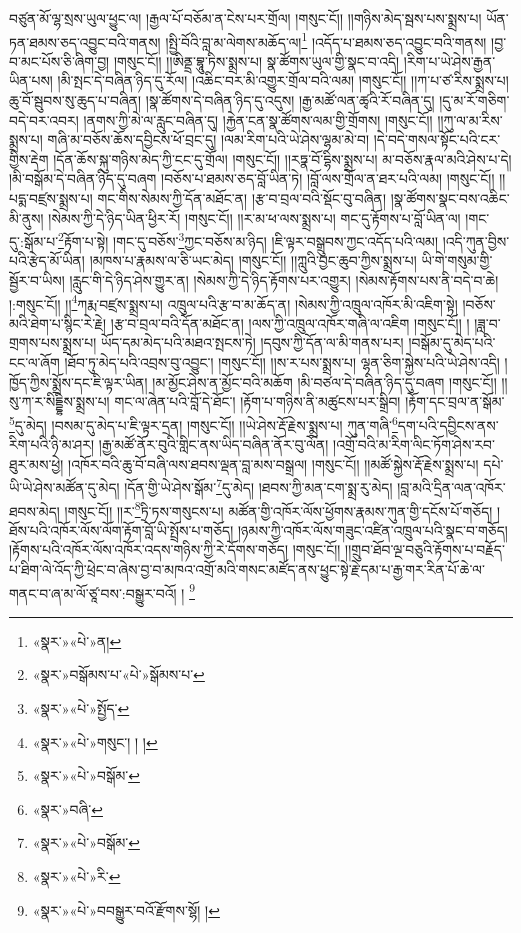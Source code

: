བཙུན་མོ་ལྷ་སྲས་ཡུལ་ཕྱུང་ལ། །རྒྱལ་པོ་བཅོམ་ན་ངེས་པར་གྲོལ། །གསུང་ངོ།། །།གཉིས་མེད་སྦས་པས་སྨྲས་པ། ཡོན་ཏན་ཐམས་ཅད་འབྱུང་བའི་གནས། །སྤྱི་བོའི་བླ་མ་ལེགས་མཆོད་ལ།\footnote{«སྣར་»«པེ་»ན།} །འདོད་པ་ཐམས་ཅད་འབྱུང་བའི་གནས། །བྱ་བ་མང་པོས་ཅི་ཞིག་བྱ། །གསུང་ངོ།། །།ཨིནྡྲ་བྷཱུ་ཏིས་སྨྲས་པ། སྣ་ཚོགས་ཡུལ་གྱི་སྣང་བ་འདི། །རིག་པ་ཡེ་ཤེས་རྒྱན་ཡིན་པས། །མི་སྤང་དེ་བཞིན་ཉིད་དུ་རོལ། །འཆིང་བར་མི་འགྱུར་གྲོལ་བའི་ལམ། །གསུང་ངོ།། །།ཀ་པ་ཙ་རིས་སྨྲས་པ། ཆུ་བོ་སྦུབས་སུ་ཆུད་པ་བཞིན། །སྣ་ཚོགས་དེ་བཞིན་ཉིད་དུ་འདུས། །རྒྱ་མཚོ་ལན་ཚྭའི་རོ་བཞིན་དུ། །དུ་མ་རོ་གཅིག་བདེ་བར་འབར། །ནགས་ཀྱི་མེ་ལ་རླུང་བཞིན་དུ། །རྐྱེན་ངན་སྣ་ཚོགས་ལམ་གྱི་གྲོགས། །གསུང་ངོ།། །།ཀུ་ལ་མ་རིས་སྨྲས་པ། གཞི་མ་བཅོས་ཆོས་དབྱིངས་ཕོ་བྲང་དུ། །ལམ་རིག་པའི་ཡེ་ཤེས་ལྷམ་མེ་བ། །དེ་བདེ་གསལ་སྟོང་པའི་ངར་གྱིས་རྡེག །དོན་ཆོས་སྐུ་གཉིས་མེད་ཀྱི་ངང་དུ་གྲོལ། །གསུང་ངོ།། །།རཏྣ་བོ་དྷིས་སྨྲས་པ། མ་བཅོས་རྣལ་མའི་ཤེས་པ་དེ། །མི་བསྒོམ་དེ་བཞིན་ཉིད་དུ་བཞག །བཅོས་པ་ཐམས་ཅད་བློ་ཡིན་ཏེ། །བློ་ལས་གྲོལ་ན་ཐར་པའི་ལམ། །གསུང་ངོ།། །།པདྨ་བཛྲས་སྨྲས་པ། གང་གིས་སེམས་ཀྱི་དོན་མཐོང་ན། །རྩ་བ་བྲལ་བའི་སྡོང་བུ་བཞིན། །སྣ་ཚོགས་སྣང་བས་འཆིང་མི་ནུས། །སེམས་ཀྱི་དེ་ཉིད་ཡིན་ཕྱིར་རོ། །གསུང་ངོ།། །།ར་མ་ཕ་ལས་སྨྲས་པ། གང་དུ་རྟོགས་པ་བློ་ཡིན་ལ། །གང་དུ་:སྒོམ་པ་\footnote{«སྣར་»བསྒོམས་པ་«པེ་»སྒོམས་པ་}རྟོག་པ་སྟེ། །གང་དུ་བཅོས་\footnote{«སྣར་»«པེ་»སྤྱོད་}ཀྱང་བཅོས་མ་ཉིད། །ཇི་ལྟར་བསྒྲུབས་ཀྱང་འདོད་པའི་ལམ། །འདི་ཀུན་བྱིས་པའི་རྩེད་མོ་ཡིན། །མཁས་པ་རྣམས་ལ་ཅི་ཡང་མེད། །གསུང་ངོ།། །།ཀླུའི་བྱང་ཆུབ་ཀྱིས་སྨྲས་པ། ཡི་གེ་གསུམ་གྱི་སྦྱོར་བ་ཡིས། །རླུང་གི་དེ་ཉིད་ཤེས་གྱུར་ན། །སེམས་ཀྱི་དེ་ཉིད་རྟོགས་པར་འགྱུར། །སེམས་རྟོགས་པས་ནི་བདེ་བ་ཆེ། །:གསུང་ངོ།། །།\footnote{«སྣར་»«པེ་»གསུང་། ། །}ཀརྨ་བཛྲས་སྨྲས་པ། འཁྲུལ་པའི་རྩ་བ་མ་ཆོད་ན། །སེམས་ཀྱི་འཁྲུལ་འཁོར་མི་འཇིག་སྟེ། །བཅོས་མའི་ཐེག་པ་སྙིང་རེ་རྗེ། །རྩ་བ་བྲལ་བའི་དོན་མཐོང་ན། །ལས་ཀྱི་འཁྲུལ་འཁོར་གཞི་ལ་འཇིག །གསུང་ངོ།། །
།ཟླ་བ་གྲགས་པས་སྨྲས་པ། ཡོད་དམ་མེད་པའི་མཐའ་སྤངས་ཏེ། །དབུས་ཀྱི་དོན་ལ་མི་གནས་པར། །བསྒོམ་དུ་མེད་པའི་ངང་ལ་ཞོག །ཐོབ་ཏུ་མེད་པའི་འབྲས་བུ་འབྱུང་། །གསུང་ངོ།། །།ས་ར་པས་སྨྲས་པ། ལྷན་ཅིག་སྐྱེས་པའི་ཡེ་ཤེས་འདི། །ཁྱོད་ཀྱིས་སྨྲོས་དང་ཇི་ལྟར་ཡིན། །མ་མྱོང་ཤེས་ན་མྱོང་བའི་མཆོག །མི་བཙལ་དེ་བཞིན་ཉིད་དུ་བཞག །གསུང་ངོ།། །།སུ་ཀ་ར་སིདྡྷིས་སྨྲས་པ། གང་ལ་ཞེན་པའི་བློ་དེ་ཐོང་། །རྟོག་པ་གཉིས་ནི་མཚུངས་པར་སྒྲིབ། །རྟོག་དང་བྲལ་ན་སྒོམ་\footnote{«སྣར་»«པེ་»བསྒོམ་}དུ་མེད། །བསམ་དུ་མེད་པ་ཇི་ལྟར་དྲན། །གསུང་ངོ།། །།ཡེ་ཤེས་རྡོ་རྗེས་སྨྲས་པ། ཀུན་གཞི་\footnote{«སྣར་»བཞི་}དག་པའི་དབྱིངས་ནས་རིག་པའི་ཉི་མ་ཤར། །རྒྱ་མཚོ་ནོར་བུའི་གླིང་ནས་ཡིད་བཞིན་ནོར་བུ་ལོན། །འགྲོ་བའི་མ་རིག་ལིང་ཏོག་ཤེས་རབ་ཐུར་མས་ཕྱེ། །འཁོར་བའི་ཆུ་བོ་བཞི་ལས་ཐབས་ལྡན་བླ་མས་བསྒྲལ། །གསུང་ངོ།། །།མཚོ་སྐྱེས་རྡོ་རྗེས་སྨྲས་པ། དཔེ་ཡི་ཡེ་ཤེས་མཚོན་དུ་མེད། །དོན་གྱི་ཡེ་ཤེས་སྒོམ་\footnote{«སྣར་»«པེ་»བསྒོམ་}དུ་མེད། །ཐབས་ཀྱི་མན་ངག་སྨྲ་རུ་མེད། །བླ་མའི་དྲིན་ལན་འཁོར་ཐབས་མེད། །གསུང་ངོ།། །།ར་\footnote{«སྣར་»«པེ་»རི་}ཏྲི་ཏས་གསུངས་པ། མཚོན་གྱི་འཁོར་ལོས་ཕྱོགས་རྣམས་ཀུན་གྱི་དངོས་པོ་གཅོད། །ཐོས་པའི་འཁོར་ལོས་ལོག་རྟོག་བློ་ཡི་སྤྲོས་པ་གཅོད། །ཉམས་ཀྱི་འཁོར་ལོས་གཟུང་འཛིན་འཁྲུལ་པའི་སྣང་བ་གཅོད། །རྟོགས་པའི་འཁོར་ལོས་འཁོར་འདས་གཉིས་ཀྱི་རེ་དོགས་གཅོད། །གསུང་ངོ།། །།གྲུབ་ཐོབ་ལྔ་བཅུའི་རྟོགས་པ་བརྗོད་པ་ཐིག་ལེ་འོད་ཀྱི་ཕྲེང་བ་ཞེས་བྱ་བ་མཁའ་འགྲོ་མའི་གསང་མཛོད་ནས་ཕྱུང་སྟེ་རྗེ་དམ་པ་རྒྱ་གར་རིན་པོ་ཆེ་ལ་གནང་བ་ཞ་མ་ལོ་ཙཱ་བས་:བསྒྱུར་བའོ། ། \footnote{«སྣར་»«པེ་»བབསྒྱུར་བའོ་རྫོགས་སྷོ། ། }